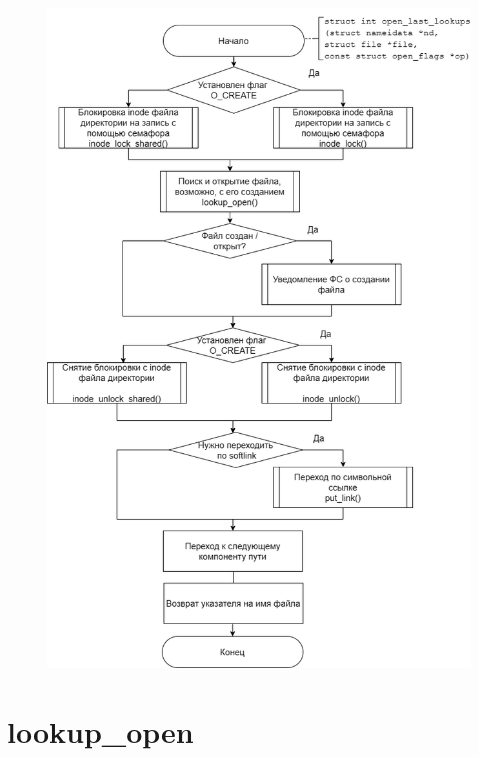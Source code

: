 \documentclass[12pt]{report}
\begin{document}
	\begin{figure}[H]
		\centering
		\includegraphics[scale=0.55]{open_last_lookups}
	\end{figure}
	
	\section{lookup\_open}
	
\end{document}
